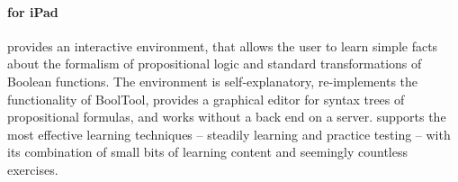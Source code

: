 \paragraph{\Nyaya for iPad} provides an interactive environment,
that allows the user to learn simple facts about the formalism of propositional logic 
and standard transformations of Boolean functions. 
The environment is self-explanatory, re-implements the functionality of  BoolTool,
provides a graphical editor for syntax trees of propositional formulas, and 
works without a back end on a server.
\Nyaya supports the most effective learning techniques – 
steadily learning and practice testing \cite{Dunlosky01012013} –
with its combination 
of small bits of learning content and seemingly countless exercises. 


%
